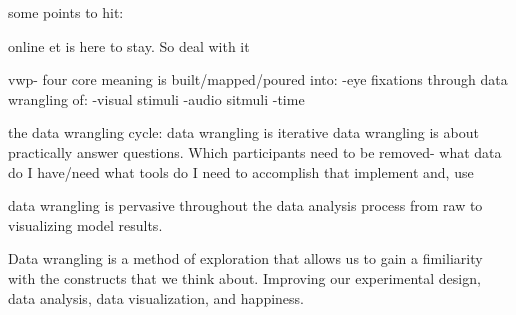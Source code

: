 some points to hit:


online et is here to stay. So deal with it

vwp- four core
meaning is built/mapped/poured into:
-eye fixations
through data wrangling of:
-visual stimuli
-audio sitmuli
-time


the data wrangling cycle: 
data wrangling is iterative
data wrangling is about practically answer questions. Which participants need to be removed-
what data do I have/need
what tools do I need to accomplish that
implement
and, use

data wrangling is pervasive throughout the data analysis process from raw to visualizing model results.

Data wrangling is a method of exploration that allows us to gain a fimiliarity with the constructs that we think about. Improving our experimental design, data analysis, data visualization, and happiness.